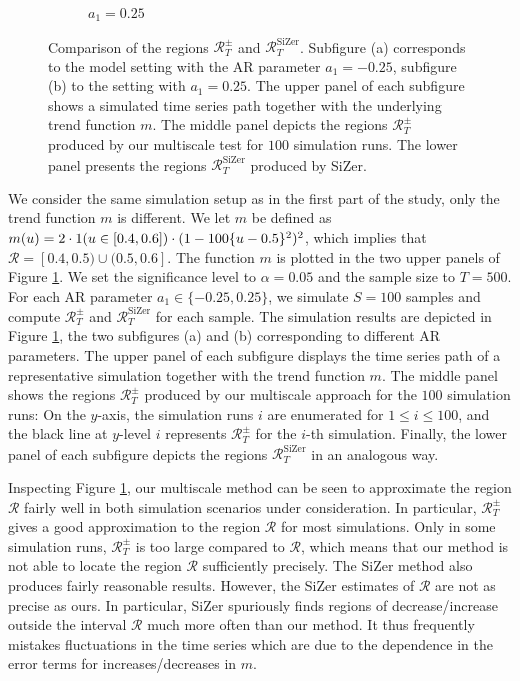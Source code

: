 \begin{figure}[t]
\begin{subfigure}{.5\textwidth}
\caption{$a_1 = 0.25$}
\end{subfigure}
\caption{Comparison of the regions $\mathcal{R}_T^\pm$ and $\mathcal{R}_T^{\text{SiZer}}$. Subfigure (a) corresponds to the model setting with the AR parameter $a_1 = -0.25$, subfigure (b) to the setting with $a_1 = 0.25$. The upper panel of each subfigure shows a simulated time series path together with the underlying trend function $m$. The middle panel depicts the regions $\mathcal{R}_T^\pm$ produced by our multiscale test for $100$ simulation runs. The lower panel presents the regions $\mathcal{R}_T^{\text{SiZer}}$ produced by SiZer.}  
\label{fig:comparison_SiZer}
\end{figure}


We consider the same simulation setup as in the first part of the study, only the trend function $m$ is different. We let $m$ be defined as $m(u) = 2 \cdot 1(u \in [0.4,0.6]) \cdot (1 - 100 \{u-0.5\}^2)^2$, which implies that $\mathcal{R} = [0.4,0.5) \cup (0.5,0.6]$. The function $m$ is plotted in the two upper panels of Figure \ref{fig:comparison_SiZer}. We set the significance level to $\alpha= 0.05$ and the sample size to $T=500$. For each AR parameter $a_1 \in \{ -0.25,0.25 \}$, we simulate $S=100$ samples and compute $\mathcal{R}_T^\pm$ and $\mathcal{R}_T^{\text{SiZer}}$ for each sample. The simulation results are depicted in Figure \ref{fig:comparison_SiZer}, the two subfigures (a) and (b) corresponding to different AR parameters. The upper panel of each subfigure displays the time series path of a representative simulation together with the trend function $m$. The middle panel shows the regions $\mathcal{R}_T^\pm$ produced by our multiscale approach for the $100$ simulation runs: On the $y$-axis, the simulation runs $i$ are enumerated for $1 \le i \le 100$, and the black line at $y$-level $i$ represents $\mathcal{R}_T^\pm$ for the $i$-th simulation. Finally, the lower panel of each subfigure depicts the regions $\mathcal{R}_T^{\text{SiZer}}$ in an analogous way. 


Inspecting Figure \ref{fig:comparison_SiZer}, our multiscale method can be seen to approximate the region $\mathcal{R}$ fairly well in both simulation scenarios under consideration. In particular, $\mathcal{R}_T^\pm$ gives a good approximation to the region $\mathcal{R}$ for most simulations. Only in some simulation runs, $\mathcal{R}_T^\pm$ is too large compared to $\mathcal{R}$, which means that our method is not able to locate the region $\mathcal{R}$ sufficiently precisely. The SiZer method also produces fairly reasonable results. However, the SiZer estimates of $\mathcal{R}$ are not as precise as ours. In particular, SiZer spuriously finds regions of decrease/increase outside the interval $\mathcal{R}$ much more often than our method. It thus frequently mistakes fluctuations in the time series which are due to the dependence in the error terms for increases/decreases in $m$. 

